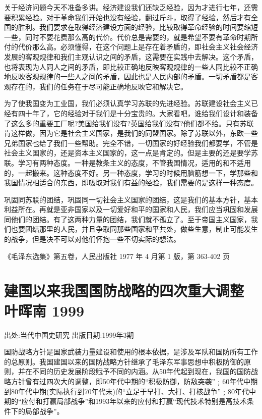 \documentclass[UTF8, 12pt, a4paper]{ctexrep}
\begin{document}
关于经济问题今天不准备多讲。经济建设我们还缺乏经验，因为才进行七年，还需要积累经验。对于革命我们开始也没有经验，翻过斤斗，取得了经验，然后才有全国的胜利。我们要求在取得经济建设方面的经验，比较取得革命经验的时间要缩短一些，同时不要花费那么高的代价。代价总是需要的，就是希望不要有革命时期所付的代价那么高。必须懂得，在这个问题上是存在着矛盾的，即社会主义社会经济发展的客观规律和我们主观认识之间的矛盾，这需要在实践中去解决。这个矛盾，也将表现为人同人之间的矛盾，即比较正确地反映客观规律的一些人同比较不正确地反映客观规律的一些人之间的矛盾，因此也是人民内部的矛盾。一切矛盾都是客观存在的，我们的任务在于尽可能正确地反映它和解决它。

为了使我国变为工业国，我们必须认真学习苏联的先进经验。苏联建设社会主义已经有四十年了，它的经验对于我们是十分宝贵的。大家看吧，谁给我们设计和装备了这么多的重要工厂呢?美国给我们没有?英国给我们没有?他们都不给。只有苏联肯这样做，因为它是社会主义国家，是我们的同盟国家。除了苏联以外，东欧一些兄弟国家也给了我们一些帮助。完全不错，一切国家的好经验我们都要学，不管是社会主义国家的，还是资本主义国家的，这一点是肯定的。但是主要的还是要学苏联。学习有两种态度。一种是教条主义的态度，不管我国情况，适用的和不适用的，一起搬来。这种态度不好。另一种态度，学习的时候用脑筋想一下，学那些和我国情况相适合的东西，即吸取对我们有益的经验，我们需要的是这样一种态度。

巩固同苏联的团结，巩固同一切社会主义国家的团结，这是我们的基本方针，基本利益所在。再就是亚非国家以及一切爱好和平的国家和人民，我们应当巩固和发展同他们的团结。有了这两种力量的团结，我们就不孤立了。至于帝国主义国家，我们也要团结那里的人民，并且争取同那些国家和平共处，做些生意，制止可能发生的战争，但是决不可以对他们怀抱一些不切实际的想法。

《毛泽东选集》第五卷，人民出版社 1977 年 4 月第 1 版，第 363-402 页

\newpage
\chapter{建国以来我国国防战略的四次重大调整 叶晖南 1999}

出处:当代中国史研究 出版日期:1999年3期

\newpage

国防战略方针是国家武装力量建设和使用的根本依据，是涉及军队和国防所有工作的总原则。我国建国以来的国防战略方针继承了毛泽东军事思想中积极防御的原则，并在不同的历史发展阶段赋予不同的内涵。从50年代起到现在，我国的国防战略方针曾有过四次大的调整，即50年代中期的“积极防御，防敌突袭”﹔60年代中期到80年代中期(实际执行到70年代末)的“立足于早打、大打、打核战争”﹔80年代中期的“应付和打赢局部战争”和1993年以来的应付和打赢“现代技术特别是高技术条件下的局部战争”。
\end{document}
